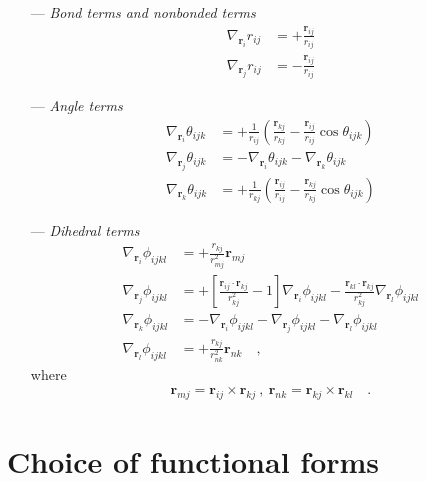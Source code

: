 \documentclass[10pt,a4paper,openany]{memoir}
\numberwithin{equation}{section}
\newcommand{\rsub}[1]{\mathbf{r}_{#1}}
\begin{document}
\begin{itemize}
  \item [---]\textit{Bond terms and nonbonded terms}
  \begin{align}
  \label{eq:distance-gradient}
  \nabla_{\mathbf{r}_i}r_{ij} & = +\frac{\mathbf{r}_{ij}}{r_{ij}} \\ \nonumber
  \nabla_{\mathbf{r}_j}r_{ij} & = -\frac{\mathbf{r}_{ij}}{r_{ij}}
  \end{align}
  \item[---]\textit{Angle terms}
\begin{align}
  \label{eq:angle-gradient}
  \nabla_{\mathbf{r}_i}\theta_{ijk} & = +\frac{1}{r_{ij}}\left( \frac{\rsub{kj}}{r_{kj}} - \frac{\rsub{ij}}{r_{ij}} \cos \theta_{ijk} \right) \\ \nonumber
  \nabla_{\mathbf{r}_j}\theta_{ijk} & = -\nabla_{\mathbf{r}_i}\theta_{ijk}-\nabla_{\mathbf{r}_k}\theta_{ijk} \\ \nonumber
  \nabla_{\mathbf{r}_k}\theta_{ijk} & = +\frac{1}{r_{kj}}\left( \frac{\rsub{ij}}{r_{ij}} - \frac{\rsub{kj}}{r_{kj}} \cos \theta_{ijk} \right)
\end{align}
\item [---]\textit{Dihedral terms}
  \begin{align}
    \label{eq:dihedral-gradient}
    \nabla_{\mathbf{r}_i}\phi_{ijkl} & = +\frac{r_{kj}}{r_{mj}^2}\rsub{mj} \\ \nonumber
    \nabla_{\mathbf{r}_j}\phi_{ijkl} & = +\left[\frac{\rsub{ij}\cdot\rsub{kj}}{r_{kj}^2}- 1\right]\nabla_{\rsub{i}}\phi_{ijkl} - \frac{\rsub{kl}\cdot\rsub{kj}}{r_{kj}^2}\nabla_{\rsub{l}}\phi_{ijkl}\\ \nonumber
    \nabla_{\mathbf{r}_k}\phi_{ijkl} & = -\nabla_{\rsub{i}}\phi_{ijkl} - \nabla_{\rsub{j}}\phi_{ijkl} - \nabla_{\rsub{l}}\phi_{ijkl}\\ \nonumber
    \nabla_{\mathbf{r}_l}\phi_{ijkl} & = +\frac{r_{kj}}{r_{nk}^2}\rsub{nk}  \quad ,
  \end{align}
  where
  \begin{align*}
    \rsub{mj} = \rsub{ij}\times\rsub{kj}\ ,\ \rsub{nk} = \rsub{kj}\times\rsub{kl}\quad .
  \end{align*}
\end{itemize}

\section{Choice of functional forms}
\label{sec:choice-of-functional-forms}
\end{document}
